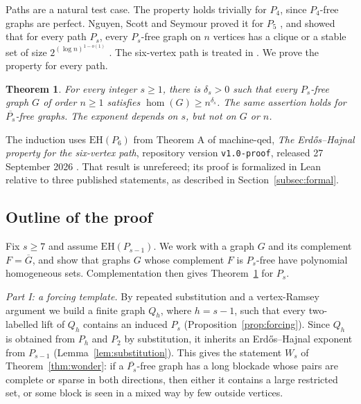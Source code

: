 \documentclass[11pt,a4paper]{article}
\newtheorem{theorem}{Theorem}[section]
\theoremstyle{definition}
\theoremstyle{remark}
\numberwithin{equation}{section}
\newcommand{\EH}{\mathrm{EH}}
\begin{document}
Paths are a natural test case. The property holds trivially for \(P_4\), since \(P_4\)-free graphs are perfect. Nguyen, Scott and Seymour proved it for \(P_5\) \cite{nss7}, and showed that for every path \(P_s\), every \(P_s\)-free graph on \(n\) vertices has a clique or a stable set of size \(2^{(\log n)^{1-o(1)}}\) \cite{nss}. The six-vertex path is treated in \cite{p6}. We prove the property for every path.
\begin{theorem}\label{thm:target}
For every integer \(s\ge1\), there is \(\delta_s>0\) such that every \(P_s\)-free graph \(G\) of order \(n\ge1\) satisfies \(\hom(G)\ge n^{\delta_s}\). The same assertion holds for \(\overline{P_s}\)-free graphs. The exponent depends on \(s\), but not on \(G\) or \(n\).
\end{theorem}
The induction uses \(\EH(P_6)\) from Theorem A of machine-qed, \emph{The Erd\H{o}s--Hajnal property for the six-vertex path}, repository version \texttt{v1.0-proof}, released 27 September 2026 \cite{p6}. That result is unrefereed; its proof is formalized in Lean relative to three published statements, as described in Section~\ref{subsec:formal}.

\subsection{Outline of the proof}\label{subsec:outline}
Fix \(s\ge7\) and assume \(\EH(P_{s-1})\). We work with a graph \(G\) and its complement \(F=\overline G\), and show that graphs \(G\) whose complement \(F\) is \(P_s\)-free have polynomial homogeneous sets. Complementation then gives Theorem~\ref{thm:target} for \(P_s\).

\emph{Part I: a forcing template.} By repeated substitution and a vertex-Ramsey argument we build a finite graph \(Q_h\), where \(h=s-1\), such that every two-labelled lift of \(Q_h\) contains an induced \(P_s\) (Proposition~\ref{prop:forcing}). Since \(Q_h\) is obtained from \(P_h\) and \(P_2\) by substitution, it inherits an Erd\H{o}s--Hajnal exponent from \(P_{s-1}\) (Lemma~\ref{lem:substitution}). This gives the statement \(W_s\) of Theorem~\ref{thm:wonder}: if a \(\overline{P_s}\)-free graph has a long blockade whose pairs are complete or sparse in both directions, then either it contains a large restricted set, or some block is seen in a mixed way by few outside vertices.
\end{document}
